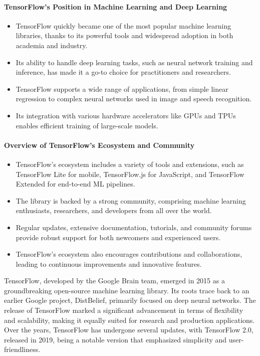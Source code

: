 \documentclass[a4paper,12pt]{book}
\begin{document}
\paragraph{TensorFlow's Position in Machine Learning and Deep Learning}
\begin{itemize}
    \item TensorFlow quickly became one of the most popular machine learning libraries, thanks to its powerful tools and widespread adoption in both academia and industry.
    \item Its ability to handle deep learning tasks, such as neural network training and inference, has made it a go-to choice for practitioners and researchers.
    \item TensorFlow supports a wide range of applications, from simple linear regression to complex neural networks used in image and speech recognition.
    \item Its integration with various hardware accelerators like GPUs and TPUs enables efficient training of large-scale models.
\end{itemize}

\paragraph{Overview of TensorFlow's Ecosystem and Community}
\begin{itemize}
    \item TensorFlow's ecosystem includes a variety of tools and extensions, such as TensorFlow Lite for mobile, TensorFlow.js for JavaScript, and TensorFlow Extended for end-to-end ML pipelines.
    \item The library is backed by a strong community, comprising machine learning enthusiasts, researchers, and developers from all over the world.
    \item Regular updates, extensive documentation, tutorials, and community forums provide robust support for both newcomers and experienced users.
    \item TensorFlow's ecosystem also encourages contributions and collaborations, leading to continuous improvements and innovative features.
\end{itemize}



TensorFlow, developed by the Google Brain team, emerged in 2015 as a groundbreaking open-source machine learning library. Its roots trace back to an earlier Google project, DistBelief, primarily focused on deep neural networks. The release of TensorFlow marked a significant advancement in terms of flexibility and scalability, making it equally suited for research and production applications. Over the years, TensorFlow has undergone several updates, with TensorFlow 2.0, released in 2019, being a notable version that emphasized simplicity and user-friendliness.
\end{document}
